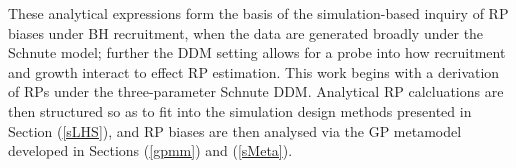 %
These analytical expressions form the basis of the simulation-based inquiry of
RP biases under BH recruitment, when the data are generated broadly under the 
Schnute model; further the DDM setting allows for a probe into how recruitment and 
growth interact to effect RP estimation. 
This work begins with a derivation of RPs under the three-parameter Schnute 
DDM. Analytical RP calcluations are then structured so as to fit into the 
simulation design methods presented in Section (\ref{sLHS}), and RP biases are 
then analysed via the GP metamodel developed in Sections (\ref{gpmm}) and (\ref{sMeta}).


